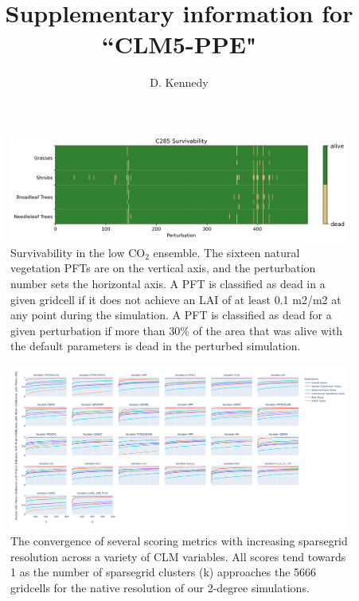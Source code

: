 \documentclass[11pt]{article}
\title{Supplementary information for ``CLM5-PPE"}
\author{D. Kennedy}
\begin{document}
\maketitle

\begin{figure}[h]
\centering
\includegraphics[width=\textwidth]{figs/supp/survivability_c285.png}
\caption{Survivability in the low CO$_2$ ensemble. The sixteen natural vegetation PFTs are on the vertical axis, and the perturbation number sets the horizontal axis. A PFT is classified as dead in a given gridcell if it does not achieve an LAI of at least 0.1 m2/m2 at any point during the simulation. A PFT is classified as dead for a given perturbation if more than 30\% of the area that was alive with the default parameters is dead in the perturbed simulation.}
\label{supp:surv}
\end{figure}

\begin{landscape}
\begin{figure}[h]
\centering
\includegraphics[width=60pc]{figs/supp/ilamb_lines.png}
\caption{The convergence of several scoring metrics with increasing sparsegrid resolution across a variety of CLM variables. All scores tend towards 1 as the number of sparsegrid clusters (k) approaches the 5666 gridcells for the native resolution of our 2-degree simulations. }
\label{supp:ilamb}
\end{figure}
\end{landscape}
\end{document}
